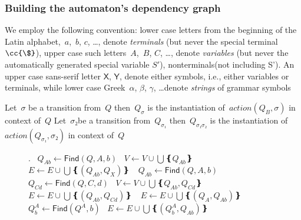 \subsubsection*{Building the automaton's dependency graph}

  We employ the following convention:
  lower case letters from the beginning of the Latin alphabet,~$a$,~$b$, $c$, …,
  denote \emph{terminals} (but never the special terminal~$\cc{\$}$),
    upper case such letters~$A$,~$B$, $C$, …, denote \emph{variables}
  (but never the automatically generated special variable $S'$), 
  nonterminals(not including S').
  An upper case sans-serif letter $\mathsf X$, $\mathsf Y$, denote
    either symbols, i.e., either variables or terminals,
    while lower case Greek~$α$, $β$, $γ$, \ldots denote \emph{strings} of grammar symbols

    Let~$σ$ be a transition from~$Q$ then~$Q_{σ}$
    is the instantiation of~$action(Q_{B},σ)$ in context
    of~$Q$
    Let~$σ₂$be a transition from~$Q_{σ₁}$ then~$Q_{σ₁σ₂}$
    is the instantiation of~$action(Q_{σ₁},σ₂)$
    in context of~$Q$
\begin{figure}
  \begin{algorithmic}[1]
    .
     
    \ENDFOR
    \STATE~$Q_{Ab}←\textsf{Find}(Q,A,b)$
    \STATE~$V←V\cup \bigcup❴ Q_{Ab}❵~$
    \STATE~$E←E\cup \bigcup❴ (Q_{Ab},Q_{X})❵~$
    \ENDFOR
    \STATE~$Q_{Ab}←\textsf{Find}(Q,A,b)$
    \STATE~$Q_{Cd}←\textsf{Find}(Q,C,d)$
    \STATE~$V←V\cup \bigcup❴ Q_{Ab},Q_{Cd}❵~$
    \STATE~$E←E\cup \bigcup❴ (Q_{Ab},Q_{Cd})❵~$
    \ENDIF
    \ENDFOR
    \STATE~$E←E\cup \bigcup❴ (Q_{A},Q_{Ab})❵~$
    \STATE~$Q_{b}^{A}←\textsf{Find}(Q^{A},b)$
    \STATE~$E←E\cup \bigcup❴ (Q_{b}^{A},Q_{Ab})❵~$
    \ENDFOR
    \ENDFOR
  \end{algorithmic}
\end{figure}

\endinput
\COMMENT{Returns the state that will consume b, or null, if it cannot be determined.}

